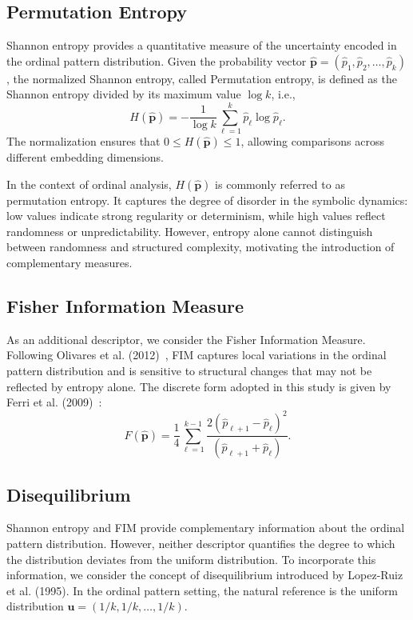 \subsection{Permutation Entropy}\label{permutation-entropy}

Shannon entropy provides a quantitative measure of the uncertainty encoded in the ordinal pattern distribution. Given the probability vector
\(\widehat{\mathbf{p}} = (\widehat{p}_1,\widehat{p}_{2},\dots,\widehat{p}_k)\), the normalized Shannon entropy, called Permutation entropy, is defined as the Shannon entropy divided by its maximum value \(\log k\), i.e., 
\[
H(\widehat{\mathbf p})
=
-\frac{1}{\log k}
\sum_{\ell=1}^{k}
\widehat p_\ell \log \widehat p_\ell.
\] 
The normalization ensures that \(0\le H(\widehat{\mathbf p})\le1\),
allowing comparisons across different embedding dimensions.

In the context of ordinal analysis, \(H(\widehat{\mathbf{p}})\) is commonly referred to as permutation entropy. It captures the degree of disorder in the symbolic dynamics: low values indicate strong regularity or determinism, while high values reflect randomness or unpredictability. However, entropy alone cannot distinguish between randomness and structured complexity, motivating the introduction of
complementary measures.

\subsection{Fisher Information Measure}\label{fisher-information-measure}

As an additional descriptor, we consider the Fisher Information Measure. Following Olivares et al. (2012)~\cite{Olivares2012}, FIM captures local variations in the ordinal pattern distribution and is sensitive to structural changes that may not be reflected by entropy alone. The discrete form adopted in this study is given by Ferri et al. (2009)~\cite{Ferri2009}: 
\[
F(\widehat{\mathbf p})
=
\frac{1}{4}
\sum_{\ell=1}^{k-1}
\frac{2(\widehat p_{\ell+1}-\widehat p_\ell)^2}
{(\widehat p_{\ell+1}+\widehat p_\ell)}.
\]

\subsection{Disequilibrium}\label{disequilibrium}

Shannon entropy and FIM provide complementary information about the ordinal pattern distribution. However, neither descriptor quantifies the degree to which the distribution deviates from the uniform distribution. To incorporate this information, we consider the concept of disequilibrium introduced by Lopez-Ruiz et al. (1995)\cite{lopez1995statistical}. In the ordinal pattern setting, the natural reference is the uniform distribution \(\mathbf{u}=(1/k,1/k,\ldots,1/k)\).

